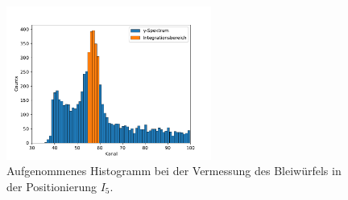 \begin{figure}[h]
  \centering
  \includegraphics[width=0.6\textwidth]{hist/hist.pdf}
  \caption{Aufgenommenes Histogramm bei der Vermessung des Bleiwürfels in der Positionierung $I_5$.}
  \label{fig: histo}
\end{figure}
